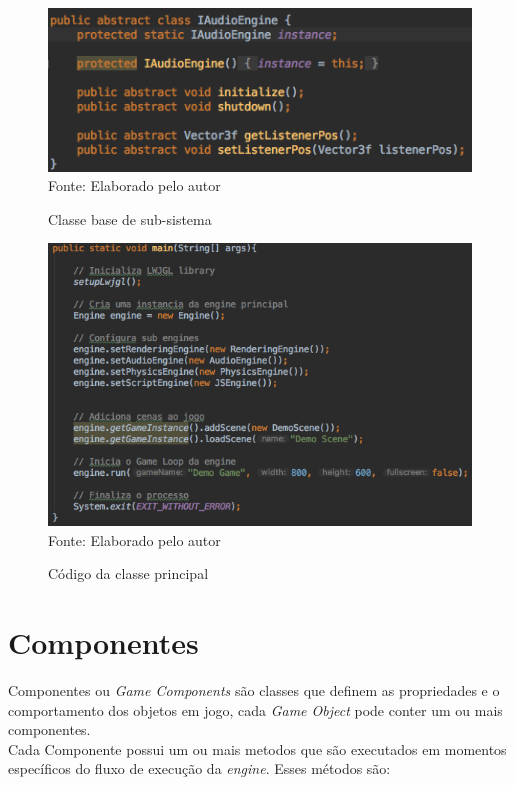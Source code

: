 \documentclass[12pt,	openright, twoside,	a4paper, english, french, spanish, brazil]{abntex2}
\begin{document}
\begin{figure}[H]
\centering
\caption{Classe base de sub-sistema}
\includegraphics[width=12cm]{imagens/subengine-interface.png}
\\
\small{Fonte: Elaborado pelo autor}
\label{figura:subengine-interface}
\end{figure}

\begin{figure}[H]
\centering
\caption{Código da classe principal}
\includegraphics[width=12cm]{imagens/codigo-main.png}
\\
\small{Fonte: Elaborado pelo autor}
\label{figura:codigo-main}
\end{figure}

%
%

\section{Componentes}

Componentes ou \textit{Game Components} são classes que definem as propriedades e o comportamento dos objetos em jogo, cada \textit{Game Object} pode conter um ou mais componentes. \\
Cada Componente possui um ou mais metodos que são executados em momentos específicos do fluxo de execução da \textit{engine}. Esses métodos são:
\end{document}
